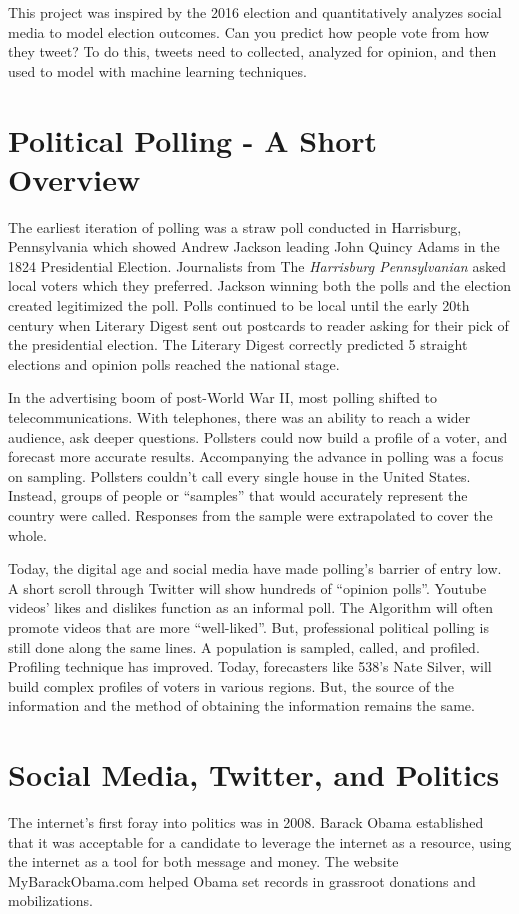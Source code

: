 \documentclass[11pt, twoside, reqno]{book}
\begin{document}
This project was inspired by the 2016 election and quantitatively analyzes social media to model election outcomes. Can you predict how people vote from how they tweet? To do this, tweets need to collected, analyzed for opinion, and then used to model with machine learning techniques. 

\section{Political Polling - A Short Overview}
\hspace{0.2in} The earliest iteration of polling was a straw poll conducted in Harrisburg, Pennsylvania which showed Andrew Jackson leading John Quincy Adams in the 1824 Presidential Election. Journalists from The \textit{Harrisburg Pennsylvanian} asked local voters which they preferred. Jackson winning both the polls and the election created legitimized the poll. Polls continued to be local until the early 20th century when Literary Digest sent out postcards to reader asking for their pick of the presidential election. The Literary Digest correctly predicted 5 straight elections and opinion polls reached the national stage. 

In the advertising boom of post-World War II, most polling shifted to telecommunications. With telephones, there was an ability to reach a wider audience, ask deeper questions. Pollsters could now build a profile of a voter, and forecast more accurate results. Accompanying the advance in polling was a focus on sampling. Pollsters couldn’t call every single house in the United States. Instead, groups of people or “samples” that would accurately represent the country were called. Responses from the sample were extrapolated to cover the whole. 

Today, the digital age and social media have made polling’s barrier of entry low. A short scroll through Twitter will show hundreds of “opinion polls”. Youtube videos’ likes and dislikes function as an informal poll. The Algorithm will often promote videos that are more “well-liked”. But, professional political polling is still done along the same lines. A population is sampled, called, and profiled. Profiling technique has improved. Today, forecasters like 538’s Nate Silver, will build complex profiles of voters in various regions. But, the source of the information and the method of obtaining the information remains the same. 

\section{Social Media, Twitter, and Politics}
\hspace{0.2in}The internet’s first foray into politics was in 2008. Barack Obama established that it was acceptable for a candidate to leverage the internet as a resource, using the internet as a tool for both message and money. The website MyBarackObama.com helped Obama set records in grassroot donations and mobilizations. 
\end{document}
